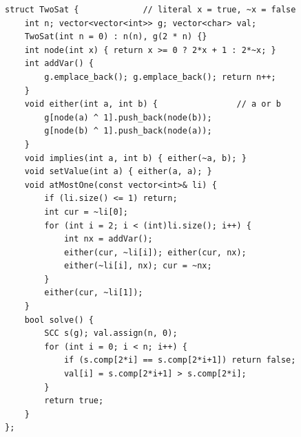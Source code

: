 \begin{lstlisting}
struct TwoSat {             // literal x = true, ~x = false
    int n; vector<vector<int>> g; vector<char> val;
    TwoSat(int n = 0) : n(n), g(2 * n) {}
    int node(int x) { return x >= 0 ? 2*x + 1 : 2*~x; }
    int addVar() {
        g.emplace_back(); g.emplace_back(); return n++;
    }
    void either(int a, int b) {                // a or b
        g[node(a) ^ 1].push_back(node(b));
        g[node(b) ^ 1].push_back(node(a));
    }
    void implies(int a, int b) { either(~a, b); }
    void setValue(int a) { either(a, a); }
    void atMostOne(const vector<int>& li) {
        if (li.size() <= 1) return;
        int cur = ~li[0];
        for (int i = 2; i < (int)li.size(); i++) {
            int nx = addVar();
            either(cur, ~li[i]); either(cur, nx);
            either(~li[i], nx); cur = ~nx;
        }
        either(cur, ~li[1]);
    }
    bool solve() {
        SCC s(g); val.assign(n, 0);
        for (int i = 0; i < n; i++) {
            if (s.comp[2*i] == s.comp[2*i+1]) return false;
            val[i] = s.comp[2*i+1] > s.comp[2*i];
        }
        return true;
    }
};
\end{lstlisting}
